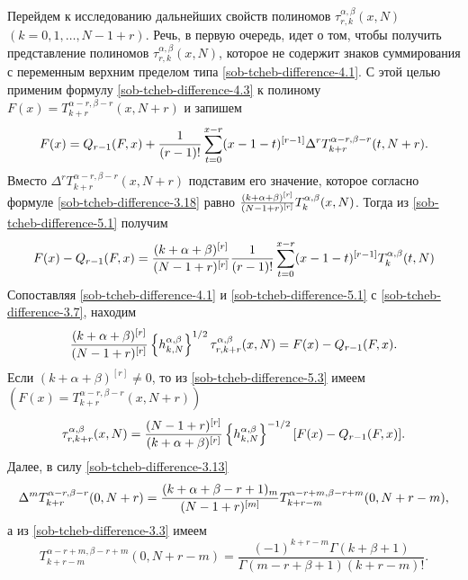 Перейдем к исследованию дальнейших свойств полиномов $\tau_{r,k}^{\alpha,\beta}(x,N)$ $(k=0, 1,\ldots, N-1+r)$. Речь, в первую очередь,  идет о том, чтобы получить представление полиномов   $\tau_{r,k}^{\alpha,\beta}(x,N)$, которое не содержит знаков суммирования с переменным верхним пределом типа \eqref{sob-tcheb-difference-4.1}. С этой целью  применим  формулу \eqref{sob-tcheb-difference-4.3}    к полиному $F(x)=T_{k+r}^{\alpha-r,\beta-r}(x,N+r)$ и запишем
 \begin{equation}\label{sob-tcheb-difference-5.1}
 F(x)=Q_{r-1}(F,x)+ {1\over(r-1)!}\sum_{t=0}^{x-r} (x-1-t)^{[r-1]}\Delta^rT_{k+r}^{\alpha-r,\beta-r}(t,N+r).
\end{equation}
Вместо $\Delta^rT_{k+r}^{\alpha-r,\beta-r}(x,N+r)$ подставим его значение, которое согласно формуле \eqref{sob-tcheb-difference-3.18} равно ${(k+\alpha+\beta)^{[r]}
\over (N-1+r)^{[r]}}T_k^{\alpha,\beta}(x,N)$. Тогда из \eqref{sob-tcheb-difference-5.1} получим
 \begin{equation}\label{sob-tcheb-difference-5.2}
F(x)-Q_{r-1}(F,x)={(k+\alpha+\beta)^{[r]}
\over (N-1+r)^{[r]}}{1\over(r-1)!}\sum_{t=0}^{x-r} (x-1-t)^{[r-1]}T_k^{\alpha,\beta}(t,N)
\end{equation}
Сопоставляя \eqref{sob-tcheb-difference-4.1} и \eqref{sob-tcheb-difference-5.1} с \eqref{sob-tcheb-difference-3.7}, находим
\begin{equation}\label{sob-tcheb-difference-5.3}
{(k+\alpha+\beta)^{[r]}\over (N-1+r)^{[r]}}\left\{h_{k,N}^{\alpha,\beta}\right\}^{1/2}\tau_{r,k+r}^{\alpha,\beta}(x,N)=
F(x)-Q_{r-1}(F,x).
\end{equation}
Если  $(k+\alpha+\beta)^{[r]}\ne0$, то из \eqref{sob-tcheb-difference-5.3} имеем $\left(F(x)=T_{k+r}^{\alpha-r,\beta-r}(x,N+r)\right)$
\begin{equation}\label{sob-tcheb-difference-5.4}
\tau_{r,k+r}^{\alpha,\beta}(x,N)= { (N-1+r)^{[r]}\over(k+\alpha+\beta)^{[r]}}\left\{h_{k,N}^{\alpha,\beta}\right\}^{-1/2}
[F(x)-Q_{r-1}(F,x)].
\end{equation}
Далее, в силу \eqref{sob-tcheb-difference-3.13}
\begin{equation}\label{sob-tcheb-difference-5.5}
\Delta^m T_{k+r}^{\alpha-r,\beta-r}(0,N+r)={(k+\alpha+\beta-r+1)_m\over
(N-1+r)^{[m]}} T_{k+r-m}^{\alpha-r+m,\beta-r+m}(0,N+r-m),
\end{equation}
а из \eqref{sob-tcheb-difference-3.3} имеем
\begin{equation}\label{sob-tcheb-difference-5.6}
 T_{k+r-m}^{\alpha-r+m,\beta-r+m}(0,N+r-m)=
 \frac{(-1)^{k+r-m}\Gamma(k+\beta+1)}{\Gamma(m-r+\beta+1)(k+r-m)!}.
\end{equation}
